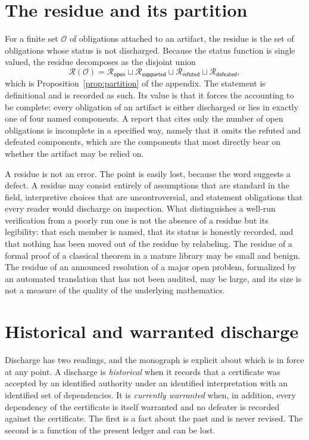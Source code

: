 \section{The residue and its partition}

For a finite set $\mathcal{O}$ of obligations attached to an artifact, the residue is the set of obligations whose status is not \textsf{discharged}. Because the status function is single valued, the residue decomposes as the disjoint union
\[
\mathcal{R}(\mathcal{O}) = \mathcal{R}_{\mathsf{open}} \sqcup \mathcal{R}_{\mathsf{supported}} \sqcup \mathcal{R}_{\mathsf{refuted}} \sqcup \mathcal{R}_{\mathsf{defeated}},
\]
which is Proposition~\ref{prop:partition} of the appendix. The statement is definitional and is recorded as such. Its value is that it forces the accounting to be complete: every obligation of an artifact is either discharged or lies in exactly one of four named components. A report that cites only the number of open obligations is incomplete in a specified way, namely that it omits the refuted and defeated components, which are the components that most directly bear on whether the artifact may be relied on.

A residue is not an error. The point is easily lost, because the word suggests a defect. A residue may consist entirely of assumptions that are standard in the field, interpretive choices that are uncontroversial, and statement obligations that every reader would discharge on inspection. What distinguishes a well-run verification from a poorly run one is not the absence of a residue but its legibility: that each member is named, that its status is honestly recorded, and that nothing has been moved out of the residue by relabeling. The residue of a formal proof of a classical theorem in a mature library may be small and benign. The residue of an announced resolution of a major open problem, formalized by an automated translation that has not been audited, may be large, and its size is not a measure of the quality of the underlying mathematics.

\section{Historical and warranted discharge}
\label{sec:warranted15}

Discharge has two readings, and the monograph is explicit about which is in force at any point. A discharge is \emph{historical} when it records that a certificate was accepted by an identified authority under an identified interpretation with an identified set of dependencies. It is \emph{currently warranted} when, in addition, every dependency of the certificate is itself warranted and no defeater is recorded against the certificate. The first is a fact about the past and is never revised. The second is a function of the present ledger and can be lost.

